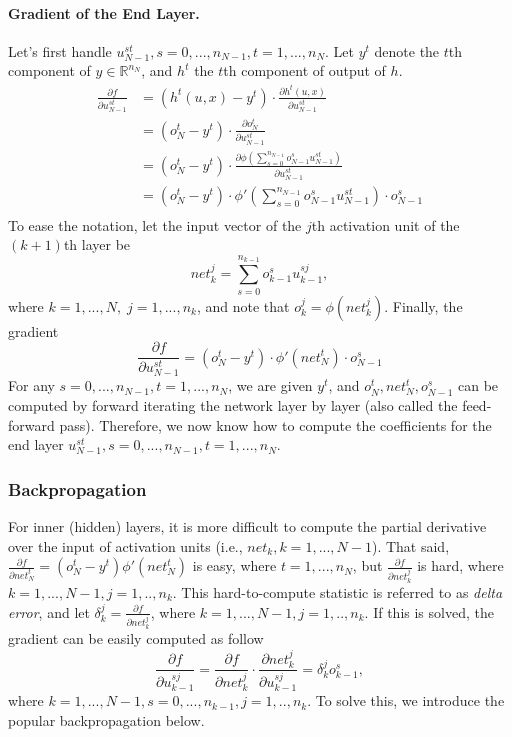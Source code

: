 \paragraph{Gradient of the End Layer.}
Let's first handle $u_{N-1}^{st}, s = 0,...,n_{N-1}, t = 1,...,n_N$.
Let $y^t$ denote the $t$th component of $y \in \mathbb{R}^{n_N}$, and $h^t$ the $t$th component of output of $h$.
\[\begin{aligned}
    \frac{\partial f}{\partial u_{N-1}^{st}}
    &= \left( h^t(u, x) - y^t \right) \cdot \frac{\partial h^t(u, x)}{\partial u_{N-1}^{st}} \\
    &= \left( o_N^t - y^t \right) \cdot \frac{\partial o_N^t}{\partial u_{N-1}^{st}} \\
    &= \left( o_N^t - y^t \right) \cdot \frac{\partial \phi \left( \sum_{s=0}^{n_{N-1}} o_{N-1}^s u_{N-1}^{st} \right)}{\partial u_{N-1}^{st}} \\
    &= \left( o_N^t - y^t \right) \cdot \phi' \left( \sum_{s=0}^{n_{N-1}} o_{N-1}^s u_{N-1}^{st} \right) \cdot o_{N-1}^s \\
\end{aligned}\]
To ease the notation, let the input vector of the $j$th activation unit of the $(k+1)$th layer be
\[\mathit{net}_k^j =\sum_{s=0}^{n_{k-1}} o_{k-1}^s u_{k-1}^{sj},\]
where $k = 1,...,N, \; j = 1,...,n_k$, and note that $o_k^j =\phi(\mathit{net}_k^j)$. Finally, the gradient
\[\frac{\partial f}{\partial u_{N-1}^{st}} = \left( o_N^t - y^t \right) \cdot \phi' ( \mathit{net}_N^t ) \cdot o_{N-1}^s\]
For any $s = 0,...,n_{N-1}, t =1,...,n_N$, we are given $y^t$, and $o_N^t, \mathit{net}_N^t, o_{N-1}^s$ can be computed by forward iterating the network layer by layer (also called the feed-forward pass). Therefore, we now know how to compute the coefficients for the end layer $u_{N-1}^{st}, s = 0,...,n_{N-1}, t =1,...,n_N$.

\subsubsection{Backpropagation}
For inner (hidden) layers, it is more difficult to compute the partial derivative over the input of activation units (i.e., $\mathit{net}_k, k = 1,...,N-1$).
That said, $\frac{\partial f}{\partial \mathit{net}_N^t} = (o_N^t - y^t) \phi'(\mathit{net}_N^t)$ is easy, where $t = 1,...,n_N$, but $\frac{\partial f}{\partial \mathit{net}_k^j}$ is hard, where $k = 1,...,N-1, j = 1,..,n_k$.
This hard-to-compute statistic is referred to as \textit{delta error}, and let $\delta_k^j = \frac{\partial f}{\partial \mathit{net}_k^j}$, where $k = 1,...,N-1, j = 1,..,n_k$.
If this is solved, the gradient can be easily computed as follow
\[\frac{\partial f}{\partial u_{k-1}^{sj}} = \boxed{\frac{\partial f}{\partial \mathit{net}_k^j}} \cdot \frac{\partial \mathit{net}_k^j}{\partial u_{k-1}^{sj}} = \boxed{\delta_k^j} o_{k-1}^s,\]
where $k = 1,...,N-1, s = 0,...,n_{k-1}, j = 1,..,n_k$.
To solve this, we introduce the popular backpropagation below.

